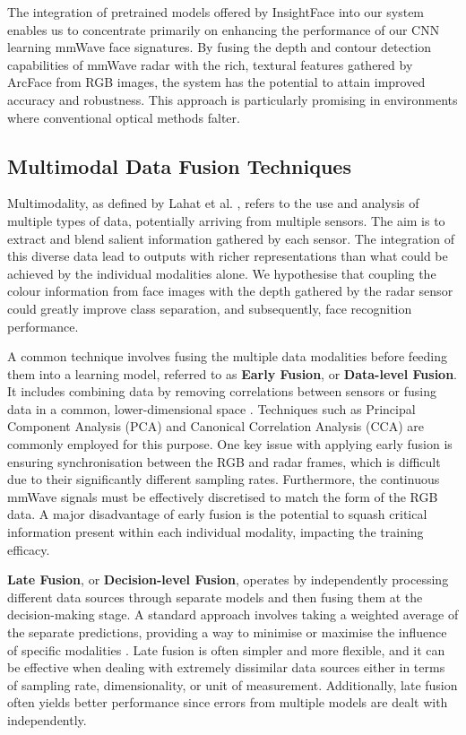 \documentclass{mpaper}
\begin{document}
The integration of pretrained models offered by InsightFace into our system enables us to concentrate primarily on enhancing the performance of our CNN learning mmWave face signatures. By fusing the depth and contour detection capabilities of mmWave radar with the rich, textural features gathered by ArcFace from RGB images, the system has the potential to attain improved accuracy and robustness. This approach is particularly promising in environments where conventional optical methods falter.


\subsection{Multimodal Data Fusion Techniques}
\label{background:multimodal_data_fusion_techniques}
Multimodality, as defined by Lahat et al. \cite{lahat2015multimodal}, refers to the use and analysis of multiple types of data, potentially arriving from multiple sensors. The aim is to extract and blend salient information gathered by each sensor. The integration of this diverse data lead to outputs with richer representations than what could be achieved by the individual modalities alone. We hypothesise that coupling the colour information from face images with the depth gathered by the radar sensor could greatly improve class separation, and subsequently, face recognition performance.

A common technique involves fusing the multiple data modalities before feeding them into a learning model, referred to as \textbf{Early Fusion}, or \textbf{Data-level Fusion}. It includes combining data by removing correlations between sensors or fusing data in a common, lower-dimensional space \cite{khaleghi2013multisensor}. Techniques such as Principal Component Analysis (PCA) and Canonical Correlation Analysis (CCA) are commonly employed for this purpose. One key issue with applying early fusion is ensuring synchronisation between the RGB and radar frames, which is difficult due to their significantly different sampling rates. Furthermore, the continuous mmWave signals must be effectively discretised to match the form of the RGB data. A major disadvantage of early fusion is the potential to squash critical information present within each individual modality, impacting the training efficacy.

\textbf{Late Fusion}, or \textbf{Decision-level Fusion}, operates by independently processing different data sources through separate models and then fusing them at the decision-making stage. A standard approach involves taking a weighted average of the separate predictions, providing a way to minimise or maximise the influence of specific modalities \cite{pawlowski2023effective}. Late fusion is often simpler and more flexible, and it can be effective when dealing with extremely dissimilar data sources either in terms of sampling rate, dimensionality, or unit of measurement. Additionally, late fusion often yields better performance since errors from multiple models are dealt with independently.
\end{document}
